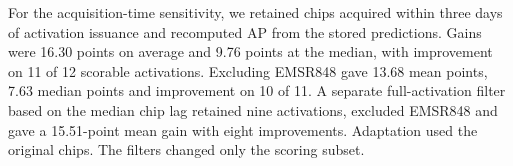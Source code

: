 For the acquisition-time sensitivity, we retained chips acquired within three days of activation issuance and recomputed AP from the stored predictions. Gains were 16.30 points on average and 9.76 points at the median, with improvement on 11 of 12 scorable activations. Excluding EMSR848 gave 13.68 mean points, 7.63 median points and improvement on 10 of 11. A separate full-activation filter based on the median chip lag retained nine activations, excluded EMSR848 and gave a 15.51-point mean gain with eight improvements. Adaptation used the original chips. The filters changed only the scoring subset.
